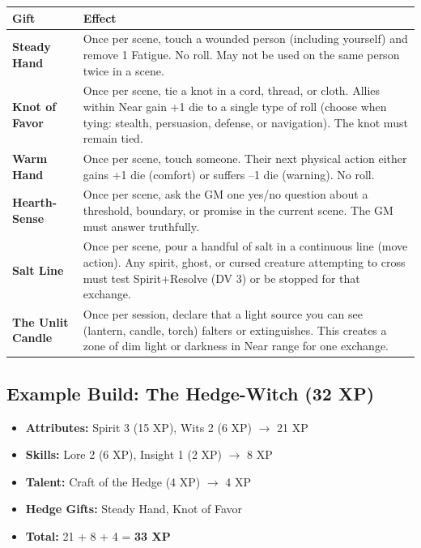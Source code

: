 \documentclass[11pt]{book}
\begin{document}
\begin{longtable}{@{}p{3.5cm}p{8cm}@{}}
\toprule
\textbf{Gift} & \textbf{Effect} \\
\midrule
\endhead
\bottomrule
\endfoot
\textbf{Steady Hand} & Once per scene, touch a wounded person (including yourself) and remove 1 Fatigue. No roll. May not be used on the same person twice in a scene. \\
\textbf{Knot of Favor} & Once per scene, tie a knot in a cord, thread, or cloth. Allies within Near gain +1 die to a single type of roll (choose when tying: stealth, persuasion, defense, or navigation). The knot must remain tied. \\
\textbf{Warm Hand} & Once per scene, touch someone. Their next physical action either gains +1 die (comfort) or suffers --1 die (warning). No roll. \\
\textbf{Hearth-Sense} & Once per scene, ask the GM one yes/no question about a threshold, boundary, or promise in the current scene. The GM must answer truthfully. \\
\textbf{Salt Line} & Once per scene, pour a handful of salt in a continuous line (move action). Any spirit, ghost, or cursed creature attempting to cross must test Spirit+Resolve (DV 3) or be stopped for that exchange. \\
\textbf{The Unlit Candle} & Once per session, declare that a light source you can see (lantern, candle, torch) falters or extinguishes. This creates a zone of dim light or darkness in Near range for one exchange. \\
\bottomrule
\end{longtable}

\subsection*{Example Build: The Hedge-Witch (32 XP)}

\begin{itemize}
  \item \textbf{Attributes:} Spirit 3 (15 XP), Wits 2 (6 XP) $\rightarrow$ 21 XP
  \item \textbf{Skills:} Lore 2 (6 XP), Insight 1 (2 XP) $\rightarrow$ 8 XP
  \item \textbf{Talent:} Craft of the Hedge (4 XP) $\rightarrow$ 4 XP
  \item \textbf{Hedge Gifts:} Steady Hand, Knot of Favor
  \item \textbf{Total:} 21 + 8 + 4 = \textbf{33 XP}
\end{itemize}
\end{document}
